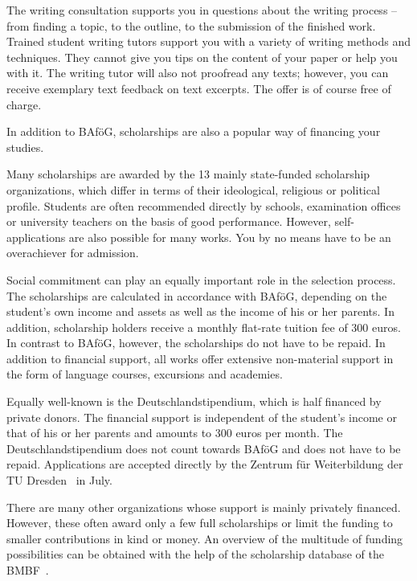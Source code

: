 The writing consultation supports you in questions about the writing process -- from finding a topic, to the outline, to the submission of the finished work. Trained student writing tutors support you with a variety of writing methods and techniques. They cannot give you tips on the content of your paper or help you with it. The writing tutor will also not proofread any texts; however, you can receive exemplary text feedback on text excerpts. The offer is of course free of charge.


In addition to BAföG, scholarships are also a popular way of financing your studies.

Many scholarships are awarded by the 13 mainly state-funded scholarship organizations, which differ in terms of their ideological, religious or political profile. Students are often recommended directly by schools, examination offices or university teachers on the basis of good performance. However, self-applications are also possible for many works. You by no means have to be an overachiever for admission.

Social commitment can play an equally important role in the selection process. The scholarships are calculated in accordance with BAföG, depending on the student's own income and assets as well as the income of his or her parents. In addition, scholarship holders receive a monthly flat-rate tuition fee of 300 euros. In contrast to BAföG, however, the scholarships do not have to be repaid. In addition to financial support, all works offer extensive non-material support in the form of language courses, excursions and academies.

Equally well-known is the Deutschlandstipendium, which is half financed by private donors. The financial support is independent of the student's income or that of his or her parents and amounts to 300 euros per month. The Deutschlandstipendium does not count towards BAföG and does not have to be repaid. Applications are accepted directly by the Zentrum für Weiterbildung der TU Dresden~ in July.

There are many other organizations whose support is mainly privately financed. However, these often award only a few full scholarships or limit the funding to smaller contributions in kind or money. An overview of the multitude of funding possibilities can be obtained with the help of the scholarship database of the BMBF~.

